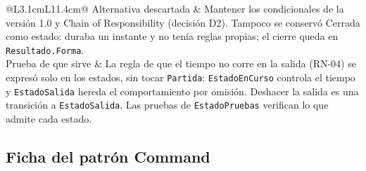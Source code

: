 {\begin{longtable}{@{}L{3.1cm}L{11.4cm}@{}}
  Alternativa descartada & Mantener los condicionales de la versión 1.0 y Chain of Responsibility (decisión D2). Tampoco se conservó Cerrada como estado: duraba un instante y no tenía reglas propias; el cierre queda en \texttt{Resultado.Forma}. \\ \filasep
  Prueba de que sirve & La regla de que el tiempo no corre en la salida (RN-04) se expresó solo en los estados, sin tocar \texttt{Partida}: \texttt{EstadoEnCurso} controla el tiempo y \texttt{EstadoSalida} hereda el comportamiento por omisión. Deshacer la salida es una transición a \texttt{EstadoSalida}. Las pruebas de \texttt{EstadoPruebas} verifican lo que admite cada estado. \\
\end{longtable}}



\clearpage
\subsection{Ficha del patrón Command}\label{sec:ficha-command}

